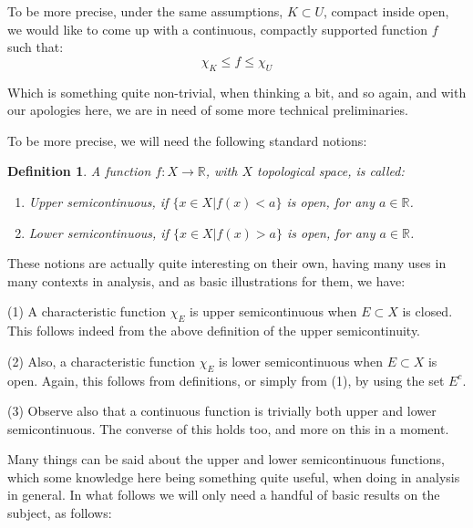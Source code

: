 \documentclass[12pt]{amsbook}
\newtheorem{definition}[theorem]{Definition}
\begin{document}
\bigskip

To be more precise, under the same assumptions, $K\subset U$, compact inside open, we would like to come up with a continuous, compactly supported function $f$ such that:
$$\chi_K\leq f\leq\chi_U$$

Which is something quite non-trivial, when thinking a bit, and so again, and with our apologies here, we are in need of some more technical preliminaries. 

\bigskip

To be more precise, we will need the following standard notions:

\begin{definition}
A function $f:X\to\mathbb R$, with $X$ topological space, is called:
\begin{enumerate}
\item Upper semicontinuous, if $\{x\in X|f(x)<a\}$ is open, for any $a\in\mathbb R$.

\item Lower semicontinuous, if $\{x\in X|f(x)>a\}$ is open, for any $a\in\mathbb R$.
\end{enumerate}
\end{definition}

These notions are actually quite interesting on their own, having many uses in many contexts in analysis, and as basic illustrations for them, we have:

\bigskip

(1) A characteristic function $\chi_E$ is upper semicontinuous when $E\subset X$ is closed. This follows indeed from the above definition of the upper semicontinuity.

\bigskip

(2) Also, a characteristic function $\chi_E$ is lower semicontinuous when $E\subset X$ is open. Again, this follows from definitions, or simply from (1), by using the set $E^c$.

\bigskip


(3) Observe also that a continuous function is trivially both upper and lower semicontinuous. The converse of this holds too, and more on this in a moment.

\bigskip

Many things can be said about the upper and lower semicontinuous functions, which some knowledge here being something quite useful, when doing in analysis in general. In what follows we will only need a handful of basic results on the subject, as follows:
\end{document}
